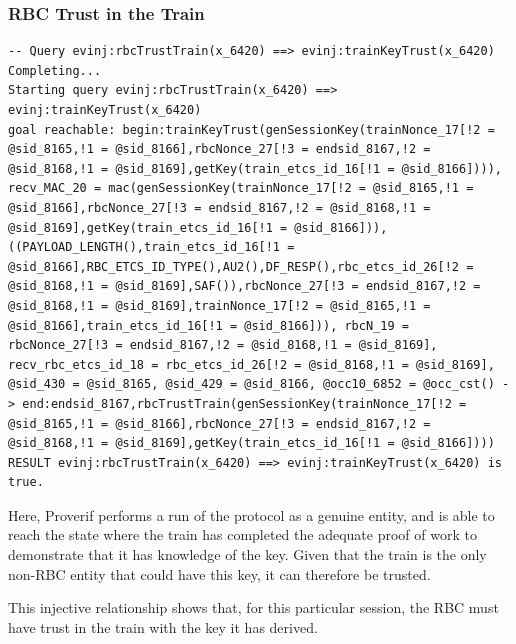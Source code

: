 \documentclass[twoside,11pt,a4paper]{article}
\begin{document}
\subsubsection{RBC Trust in the Train}
\begin{lstlisting}
-- Query evinj:rbcTrustTrain(x_6420) ==> evinj:trainKeyTrust(x_6420)
Completing...
Starting query evinj:rbcTrustTrain(x_6420) ==> evinj:trainKeyTrust(x_6420)
goal reachable: begin:trainKeyTrust(genSessionKey(trainNonce_17[!2 = @sid_8165,!1 = @sid_8166],rbcNonce_27[!3 = endsid_8167,!2 = @sid_8168,!1 = @sid_8169],getKey(train_etcs_id_16[!1 = @sid_8166]))), recv_MAC_20 = mac(genSessionKey(trainNonce_17[!2 = @sid_8165,!1 = @sid_8166],rbcNonce_27[!3 = endsid_8167,!2 = @sid_8168,!1 = @sid_8169],getKey(train_etcs_id_16[!1 = @sid_8166])),((PAYLOAD_LENGTH(),train_etcs_id_16[!1 = @sid_8166],RBC_ETCS_ID_TYPE(),AU2(),DF_RESP(),rbc_etcs_id_26[!2 = @sid_8168,!1 = @sid_8169],SAF()),rbcNonce_27[!3 = endsid_8167,!2 = @sid_8168,!1 = @sid_8169],trainNonce_17[!2 = @sid_8165,!1 = @sid_8166],train_etcs_id_16[!1 = @sid_8166])), rbcN_19 = rbcNonce_27[!3 = endsid_8167,!2 = @sid_8168,!1 = @sid_8169], recv_rbc_etcs_id_18 = rbc_etcs_id_26[!2 = @sid_8168,!1 = @sid_8169], @sid_430 = @sid_8165, @sid_429 = @sid_8166, @occ10_6852 = @occ_cst() -> end:endsid_8167,rbcTrustTrain(genSessionKey(trainNonce_17[!2 = @sid_8165,!1 = @sid_8166],rbcNonce_27[!3 = endsid_8167,!2 = @sid_8168,!1 = @sid_8169],getKey(train_etcs_id_16[!1 = @sid_8166])))
RESULT evinj:rbcTrustTrain(x_6420) ==> evinj:trainKeyTrust(x_6420) is true.
\end{lstlisting}
Here, Proverif performs a run of the protocol as a genuine entity, and is able to reach the state where the train has completed the adequate proof of work to demonstrate that it has knowledge of the key. Given that the train is the only non-RBC entity that could have this key, it can therefore be trusted.

This injective relationship shows that, for this particular session, the RBC must have trust in the train with the key it has derived.\\
\end{document}
